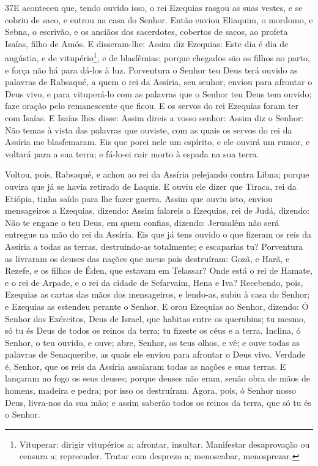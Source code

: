 \medskip

\lettrine{37}{}E aconteceu que, tendo ouvido isso, o rei
Ezequias rasgou as suas vestes, e se cobriu de saco, e entrou na
casa do Senhor. Então enviou Eliaquim, o mordomo, e Sebna, o
escrivão, e os anciãos dos sacerdotes, cobertos de sacos, ao profeta
Isaías, filho de Amós. E disseram-lhe: Assim diz Ezequias: Este
dia é dia de angústia, e de vitupério\footnote{Vituperar: dirigir
vitupérios a; afrontar, insultar. Manifestar desaprovação ou censura
a; repreender. Tratar com desprezo a; menoscabar, menosprezar.}, e
de blasfêmias; porque chegados são os filhos ao parto, e força não
há para dá-los à luz.
 Porventura o Senhor teu Deus terá ouvido as palavras de Rabsaqué,
a quem o rei da Assíria, seu senhor, enviou para afrontar o Deus
vivo, e para vituperá-lo com as palavras que o Senhor teu Deus tem
ouvido; faze oração pelo remanescente que ficou. E os servos do
rei Ezequias foram ter com Isaías. E Isaías lhes disse: Assim
direis a vosso senhor: Assim diz o Senhor: Não temas à vista das
palavras que ouviste, com as quais os servos do rei da Assíria me
blasfemaram. Eis que porei nele um espírito, e ele ouvirá um
rumor, e voltará para a sua terra; e fá-lo-ei cair morto à espada na
sua terra.

Voltou, pois, Rabsaqué, e achou ao rei da Assíria pelejando contra
Libna; porque ouvira que já se havia retirado de Laquis. E ouviu
ele dizer que Tiraca, rei da Etiópia, tinha saído para lhe fazer
guerra. Assim que ouviu isto, enviou mensageiros a Ezequias,
dizendo: Assim falareis a Ezequias, rei de Judá, dizendo: Não
te engane o teu Deus, em quem confias, dizendo: Jerusalém não será
entregue na mão do rei da Assíria. Eis que já tens ouvido o
que fizeram os reis da Assíria a todas as terras, destruindo-as
totalmente; e escaparias tu? Porventura as livraram os deuses
das nações que meus pais destruíram: Gozã, e Harã, e Rezefe, e os
filhos de Éden, que estavam em Telassar? Onde está o rei de
Hamate, e o rei de Arpade, e o rei da cidade de Sefarvaim, Hena e
Iva? Recebendo, pois, Ezequias as cartas das mãos dos
mensageiros, e lendo-as, subiu à casa do Senhor; e Ezequias as
estendeu perante o Senhor. E orou Ezequias ao Senhor,
dizendo: Ó Senhor dos Exércitos, Deus de Israel, que habitas
entre os querubins; tu mesmo, só tu és Deus de todos os reinos da
terra; tu fizeste os céus e a terra. Inclina, ó Senhor, o teu
ouvido, e ouve; abre, Senhor, os teus olhos, e vê; e ouve todas as
palavras de Senaqueribe, as quais ele enviou para afrontar o Deus
vivo. Verdade é, Senhor, que os reis da Assíria assolaram
todas as nações e suas terras. E lançaram no fogo os seus
deuses; porque deuses não eram, senão obra de mãos de homens,
madeira e pedra; por isso os destruíram. Agora, pois, ó
Senhor nosso Deus, livra-nos da sua mão; e assim saberão todos os
reinos da terra, que só tu és o Senhor.

